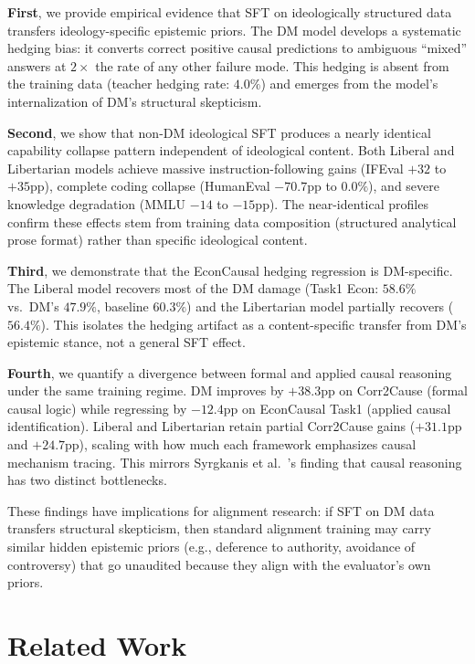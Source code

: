 \documentclass[11pt]{article}
\begin{document}
\textbf{First}, we provide empirical evidence that SFT on ideologically structured data transfers ideology-specific epistemic priors. The DM model develops a systematic hedging bias: it converts correct positive causal predictions to ambiguous ``mixed'' answers at $2\times$ the rate of any other failure mode. This hedging is absent from the training data (teacher hedging rate: $4.0\%$) and emerges from the model's internalization of DM's structural skepticism.

\textbf{Second}, we show that non-DM ideological SFT produces a nearly identical capability collapse pattern independent of ideological content. Both Liberal and Libertarian models achieve massive instruction-following gains (IFEval $+32$ to $+35$pp), complete coding collapse (HumanEval $-70.7$pp to $0.0\%$), and severe knowledge degradation (MMLU $-14$ to $-15$pp). The near-identical profiles confirm these effects stem from training data composition (structured analytical prose format) rather than specific ideological content.

\textbf{Third}, we demonstrate that the EconCausal hedging regression is DM-specific. The Liberal model recovers most of the DM damage (Task1 Econ: $58.6\%$ vs.\ DM's $47.9\%$, baseline $60.3\%$) and the Libertarian model partially recovers ($56.4\%$). This isolates the hedging artifact as a content-specific transfer from DM's epistemic stance, not a general SFT effect.

\textbf{Fourth}, we quantify a divergence between formal and applied causal reasoning under the same training regime. DM improves by $+38.3$pp on Corr2Cause (formal causal logic) while regressing by $-12.4$pp on EconCausal Task1 (applied causal identification). Liberal and Libertarian retain partial Corr2Cause gains ($+31.1$pp and $+24.7$pp), scaling with how much each framework emphasizes causal mechanism tracing. This mirrors Syrgkanis et al.~\cite{syrgkanis2026causalreasoning}'s finding that causal reasoning has two distinct bottlenecks.

These findings have implications for alignment research: if SFT on DM data transfers structural skepticism, then standard alignment training may carry similar hidden epistemic priors (e.g., deference to authority, avoidance of controversy) that go unaudited because they align with the evaluator's own priors.

\section{Related Work}
\end{document}
